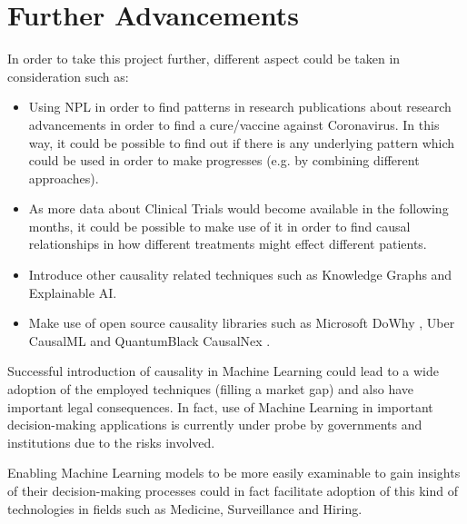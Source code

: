 \section{Further Advancements}

In order to take this project further, different aspect could be taken in consideration such as:
\vspace{-0.2cm}
\begin{itemize}
    \item Using NPL in order to find patterns in research publications about research advancements in order to find a cure/vaccine against Coronavirus. In this way, it could be possible to find out if there is any underlying pattern which could be used in order to make progresses (e.g. by combining different approaches).
    \item As more data about Clinical Trials would become available in the following months, it could be possible to make use of it in order to find causal relationships in how different treatments might effect different patients. 
    \item Introduce other causality related techniques such as Knowledge Graphs and Explainable AI. 
    \item Make use of open source causality libraries such as Microsoft DoWhy \cite{dowhy}, Uber CausalML \cite{causalml} and QuantumBlack CausalNex \cite{causalnex}. 
\end{itemize}
\vspace{-0.2cm}
Successful introduction of causality in Machine Learning could lead to a wide adoption of the employed techniques (filling a market gap) and also have important legal consequences. In fact, use of Machine Learning in important decision-making applications is currently under probe by governments and institutions due to the risks involved.

Enabling Machine Learning models to be more easily examinable to gain insights of their decision-making processes could in fact facilitate adoption of this kind of technologies in fields such as Medicine, Surveillance and Hiring.